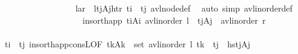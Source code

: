 \begin{isabellebody}
\ \ \ \ \ \ \ \ \ \ \ \ \ \ \ \ \isamarkupfalse%
\ {\isacartoucheopen}{\isasymlangle}l{\isacharcomma}{\kern0pt}a{\isacharcomma}{\kern0pt}r{\isasymrangle}\ {\isacharequal}{\kern0pt}\ {\isasymlangle}l{\isacharcomma}{\kern0pt}{\isacharparenleft}{\kern0pt}{\isacharparenleft}{\kern0pt}t\isactrlsub j{\isacharcomma}{\kern0pt}A\isactrlsub j{\isacharparenright}{\kern0pt}{\isacharcomma}{\kern0pt}ht{\isacharparenright}{\kern0pt}{\isacharcomma}{\kern0pt}r{\isasymrangle}{\isacartoucheclose}\ {\isacartoucheopen}t\isactrlsub i\ {\isacharequal}{\kern0pt}\ t\isactrlsub j{\isacartoucheclose}\ avl{\isacharunderscore}{\kern0pt}node{\isacharunderscore}{\kern0pt}def\ \isamarkupfalse%
\ {\isacharparenleft}{\kern0pt}auto\ simp{\isacharcolon}{\kern0pt}\ avl{\isacharunderscore}{\kern0pt}inorder{\isacharunderscore}{\kern0pt}def{\isacharparenright}{\kern0pt}\ \ \ \isanewline
\isanewline
\ \ \ \ \ \ \ \ \ \ \ \ \ \ \isamarkupfalse%
\ \isamarkupfalse%
\ {\isachardoublequoteopen}{\isachardot}{\kern0pt}{\isachardot}{\kern0pt}{\isachardot}{\kern0pt}\ {\isacharequal}{\kern0pt}\ insort{\isacharunderscore}{\kern0pt}happ\ {\isacharparenleft}{\kern0pt}t\isactrlsub i{\isacharcomma}{\kern0pt}A\isactrlsub i{\isacharparenright}{\kern0pt}\ {\isacharparenleft}{\kern0pt}avl{\isacharunderscore}{\kern0pt}inorder\ l\ {\isacharat}{\kern0pt}\ {\isacharbrackleft}{\kern0pt}{\isacharparenleft}{\kern0pt}t\isactrlsub j{\isacharcomma}{\kern0pt}A\isactrlsub j{\isacharparenright}{\kern0pt}{\isacharbrackright}{\kern0pt}{\isacharparenright}{\kern0pt}\ {\isacharat}{\kern0pt}\ avl{\isacharunderscore}{\kern0pt}inorder\ r{\isachardoublequoteclose}\isanewline
\ \ \ \ \ \ \ \ \ \ \ \ \ \ \ \ \isamarkupfalse%
\ {\isacartoucheopen}t\isactrlsub i\ {\isacharequal}{\kern0pt}\ t\isactrlsub j{\isacartoucheclose}\ insort{\isacharunderscore}{\kern0pt}happ{\isacharunderscore}{\kern0pt}consL{\isacharbrackleft}{\kern0pt}OF\ {\isacartoucheopen}{\isasymforall}{\isacharparenleft}{\kern0pt}t\isactrlsub k{\isacharcomma}{\kern0pt}A\isactrlsub k{\isacharparenright}{\kern0pt}\ {\isasymin}\ set\ {\isacharparenleft}{\kern0pt}avl{\isacharunderscore}{\kern0pt}inorder\ l{\isacharparenright}{\kern0pt}{\isachardot}{\kern0pt}\ t\isactrlsub k\ {\isacharless}{\kern0pt}\ t\isactrlsub j{\isacartoucheclose}{\isacharcomma}{\kern0pt}\ \ hst\isactrlsub j{\isacharcomma}{\kern0pt}A\isactrlsub j{\isacharparenright}{\kern0pt}{\isacharbrackright}{\kern0pt}{\isachardoublequoteclose}{\isacharbrackright}{\kern0pt}\ \isanewline

\end{isabellebody}
